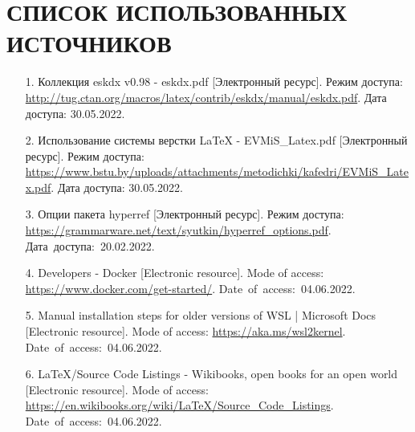 \documentclass[
  12pt, %
  a4paper, %
  simple, %
  floatsection %
]{eskdtext}
\begin{document}
  \section*{СПИСОК ИСПОЛЬЗОВАННЫХ ИСТОЧНИКОВ}
  \begin{enumerate}
    \item[1.] Коллекция eskdx v0.98 - eskdx.pdf
    [Электронный ресурс].
    Режим доступа: \url{http://tug.ctan.org/macros/latex/contrib/eskdx/manual/eskdx.pdf}.
    Дата доступа: 30.05.2022.

    \item[2.] Использование системы верстки LaTeX - EVMiS\_Latex.pdf
    [Электронный ресурс].
    Режим доступа: \url{https://www.bstu.by/uploads/attachments/metodichki/kafedri/EVMiS_Latex.pdf}.
    Дата доступа: 30.05.2022.

    \item[3.] Опции пакета hyperref
    [Электронный ресурс].
    Режим доступа: \url{https://grammarware.net/text/syutkin/hyperref_options.pdf}.
    Дата~доступа:~20.02.2022.

    \item[4.] Developers - Docker
    [Electronic resource].
    Mode of access: \url{https://www.docker.com/get-started/}.
    Date~of~access:~04.06.2022.

    \item[5.] Manual installation steps for older versions of WSL | Microsoft Docs
    [Electronic resource].
    Mode of access: \url{https://aka.ms/wsl2kernel}.
    Date~of~access:~04.06.2022.

    \item[6.] LaTeX/Source Code Listings - Wikibooks, open books for an open world
    [Electronic resource].
    Mode of access: \url{https://en.wikibooks.org/wiki/LaTeX/Source_Code_Listings}.
    Date~of~access:~04.06.2022.
  \end{enumerate}
\end{document}
